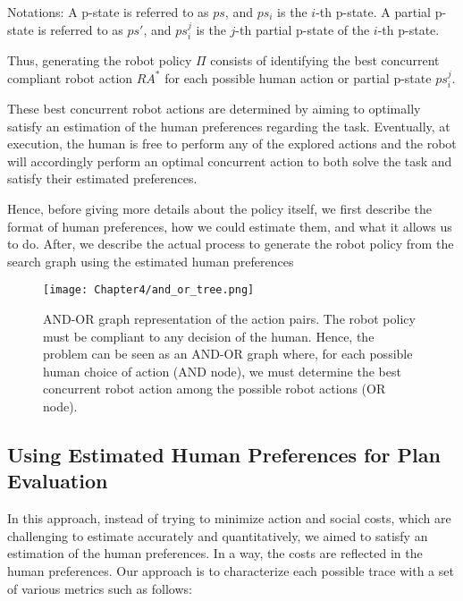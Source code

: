 Notations: A p-state is referred to as $ps$, and $ps_i$ is the $i$-th p-state. A partial p-state is referred to as $ps'$, and $ps_i^j$ is the $j$-th partial p-state of the $i$-th p-state.

Thus, generating the robot policy $\Pi$ consists of identifying the best concurrent compliant robot action $RA^*$ for each possible human action or partial p-state $ps_i^j$.

These best concurrent robot actions are determined by aiming to optimally satisfy an estimation of the human preferences regarding the task. Eventually, at execution, the human is free to perform any of the explored actions and the robot will accordingly perform an optimal concurrent action to both solve the task and satisfy their estimated preferences.

Hence, before giving more details about the policy itself, we first describe the format of human preferences, how we could estimate them, and what it allows us to do. After, we describe the actual process to generate the robot policy from the search graph using the estimated human preferences



\begin{figure}
    \texttt{[image: Chapter4/and\_or\_tree.png]}
    \caption{AND-OR graph representation of the action pairs. 
    The robot policy must be compliant to any decision of the human. Hence, the problem can be seen as an AND-OR graph where, for each possible human choice of action (AND node), we must determine the best concurrent robot action among the possible robot actions (OR node).
    }
    \label{fig:and_or}
\end{figure}


    \subsection{Using Estimated Human Preferences for Plan Evaluation}

In this approach, instead of trying to minimize action and social costs, which are challenging to estimate accurately and quantitatively, we aimed to satisfy an estimation of the human preferences. In a way, the costs are reflected in the human preferences. Our approach is to characterize each possible trace with a set of various metrics such as follows:


